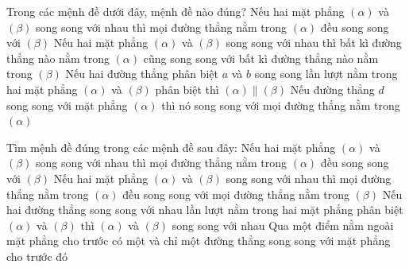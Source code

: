 \begin{ex}%
	Trong các  mệnh đề dưới đây, mệnh đề nào đúng?
	\choice 
		{\True Nếu hai mặt phẳng $\left(\alpha\right)$ và $\left(\beta\right)$ song song với  nhau thì mọi đường thẳng nằm trong $\left(\alpha\right)$ đều song song với $\left(\beta\right)$}
		{Nếu hai mặt phẳng $\left(\alpha\right)$ và $\left(\beta\right)$ song song với nhau thì bất kì đường thẳng nào nằm trong $\left(\alpha\right)$ cũng song song với bất kì đường thẳng nào  nằm trong $\left(\beta\right)$}
		{Nếu hai đường thẳng phân biệt $a$ và $b$ song song lần lượt nằm trong hai mặt phẳng $\left(\alpha\right)$ và $\left(\beta\right)$  phân biệt thì $\left(\alpha\right)\parallel \left(\beta\right)$}
		{Nếu đường thẳng $d$ song song với mặt  phẳng $\left(\alpha\right)$ thì nó song song với mọi đường thẳng nằm trong $\left(\alpha\right)$}
\end{ex}

\begin{ex}%
	 Tìm mệnh đề đúng trong các mệnh đề sau đây:
	 \choice
		{\True Nếu hai mặt phẳng $\left(\alpha\right)$ và  $\left(\beta\right)$ song song với nhau thì mọi đường thẳng nằm trong $\left(\alpha\right)$ đều song song với $\left(\beta\right)$}
		{Nếu hai mặt  phẳng $\left(\alpha\right)$ và $\left(\beta\right)$ song song với nhau thì mọi đường thẳng nằm trong $\left(\alpha\right)$ đều song song với mọi đường thẳng nằm trong $\left(\beta\right)$}
		{Nếu hai đường thẳng song song với nhau lần lượt nằm  trong hai mặt phẳng phân biệt $\left(\alpha\right)$ và $\left(\beta\right)$ thì $\left(\alpha\right)$ và $\left(\beta\right)$ song song với nhau}
		{Qua  một điểm nằm ngoài mặt phẳng cho trước có một và chỉ một đường thẳng song song với mặt phẳng cho trước đó}
\end{ex}

